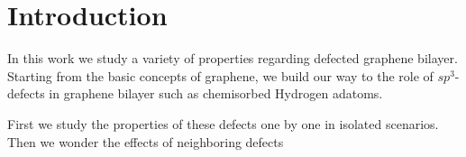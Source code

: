 \chapter{Introduction}
In this work we study a variety of properties regarding defected graphene bilayer. Starting from the basic concepts of graphene, we build our way to the role of $sp^3$-defects in graphene bilayer such as chemisorbed Hydrogen adatoms.

First we study the properties of these defects one by one in isolated scenarios. Then we wonder the effects of neighboring defects

